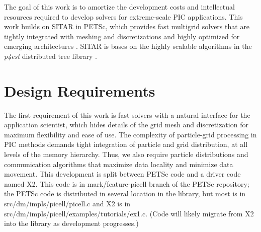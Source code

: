 \documentclass[review]{siamart}
\begin{document}
The goal of this work is to amortize the development costs and intellectual resources required to develop solvers for extreme-scale PIC applications.
This work builds on SITAR in PETSc, which provides fast multigrid solvers that are tightly integrated with meshing and discretizations and highly optimized for emerging architectures \cite{KnepleyBrownMcInnesSmithRuppAdams2015}.
SITAR is bases on the highly scalable algorithms in the {\it p4est} distributed tree library \cite{DBLP:journals/siamsc/IsaacBWG15,Rudi:2015:EIS:2807591.2807675,Stadler1033}.

\section{Design Requirements}

The first requirement of this work is fast solvers with a natural interface for the application scientist, which hides details of the grid mesh and discretization for maximum flexibility and ease of use.
The complexity of particle-grid processing in PIC methods demands tight integration of particle and grid distribution, at all levels of the memory hierarchy.
Thus, we also require particle distributions and communication algorithms that maximize data locality and minimize data movement.
This development is split between PETSc code and a driver code named X2.
This code is in mark/feature-picell branch of the PETSc repository; the PETSc code is distributed in several location in the library, but most is in src/dm/impls/picell/picell.c and X2 is in src/dm/impls/picell/examples/tutorials/ex1.c.
(Code will likely migrate from X2 into the library as development progresses.)
\end{document}
